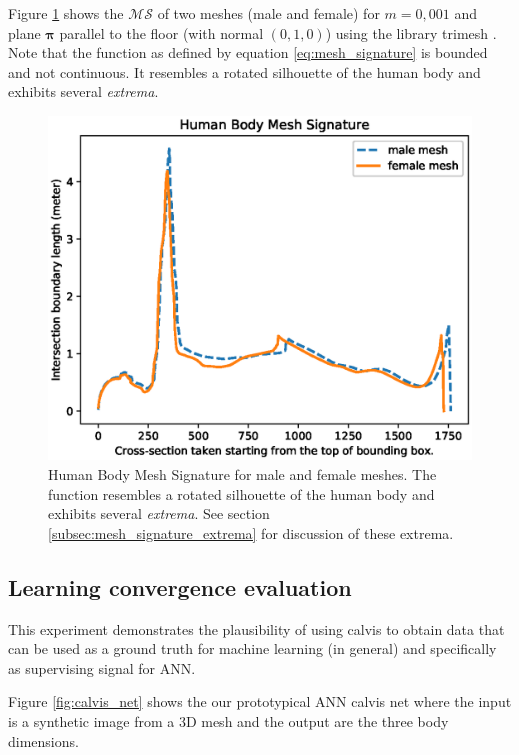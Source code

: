 \documentclass[runningheads, orivec]{llncs}
\begin{document}
Figure \ref{fig:qualitative_eval} shows the $\mathcal{MS}$ of two meshes (male 
and female) for 
$m=0,001$ and plane $\boldsymbol{\pi}$ parallel to the floor (with normal $(0, 
1,0)$) using the library trimesh \cite{trimesh}. Note that the function as 
defined by equation \ref{eq:mesh_signature} is bounded and not continuous. It 
resembles a rotated silhouette of the human body and exhibits several 
\textit{extrema}.

\begin{figure}[h!]
	\begin{center}
		\includegraphics[width=\linewidth]{Figure_1.eps}
	\end{center}
	\caption{Human Body Mesh Signature for male and female meshes. The 
		function resembles a rotated silhouette of the human body and exhibits 
		several \textit{extrema}. See section 
		\ref{subsec:mesh_signature_extrema} for discussion of these extrema.}
	\label{fig:qualitative_eval}
\end{figure}

\subsection{Learning convergence evaluation}\label{subsec:learn_conv}
This experiment demonstrates the plausibility of using calvis to obtain data 
that can be used as a ground truth for machine learning (in general) and 
specifically as supervising signal for ANN.

Figure \ref{fig:calvis_net} shows the our prototypical ANN calvis net where the 
input is a synthetic image from a 3D mesh and the output are the three body 
dimensions.
\end{document}
